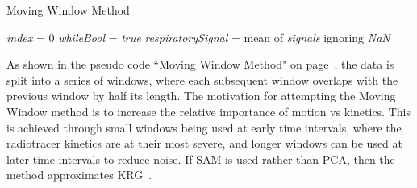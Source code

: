                 \begin{algorithm}
                    \caption{Moving Window Method}
                    \;
                    \textit{index} = $0$\;
                    \textit{whileBool} = \textit{true}\;
                    \;
                    \;
                    \textit{respiratorySignal} = mean of \textit{signals} ignoring \textit{NaN}\;
                    \;
                    
                    \label{alg:pca_data_driven_surrogate_signal_extraction_methods_for_dynamic_pet_methods_moving_window_pseudo_code}
                \end{algorithm}
                    
                As shown in the pseudo code ``Moving Window Method" on page~\pageref{alg:pca_data_driven_surrogate_signal_extraction_methods_for_dynamic_pet_methods_moving_window_pseudo_code}, the data is split into a series of windows, where each subsequent window overlaps with the previous window by half its length. The motivation for attempting the Moving Window method is to increase the relative importance of motion vs kinetics. This is achieved through small windows being used at early time intervals, where the radiotracer kinetics are at their most severe, and longer windows can be used at later time intervals to reduce noise.  If \gls{SAM} is used rather than \gls{PCA},  then the method approximates \gls{KRG}~\parencite{Schleyer2014}.
                    
